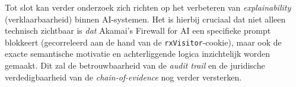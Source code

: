 Tot slot kan verder onderzoek zich richten op het verbeteren van \textit{explainability} (verklaarbaarheid) binnen AI-systemen. Het is hierbij cruciaal dat niet alleen technisch zichtbaar is \textit{dat} Akamai’s Firewall for AI een specifieke prompt blokkeert (gecorreleerd aan de hand van de \texttt{rxVisitor}-cookie), maar ook de exacte semantische motivatie en achterliggende logica inzichtelijk worden gemaakt. Dit zal de betrouwbaarheid van de \textit{audit trail} en de juridische verdedigbaarheid van de \textit{chain-of-evidence} nog verder versterken.\\
